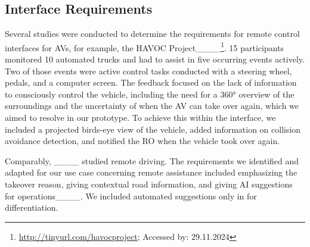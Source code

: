 


\subsection{Interface Requirements}
\label{ssec:interfacereq}
Several studies were conducted to determine the requirements for remote control interfaces for AVs, for example, the HAVOC Project____\footnote{\url{http://tinyurl.com/havocproject}; Accessed by: 29.11.2024}. 15 participants monitored 10 automated trucks and had to assist in five occurring events actively. Two of those events were active control tasks conducted with a steering wheel, pedals, and a computer screen. %
The feedback focused on the lack of information to consciously control the vehicle, including the need for a 360° overview of the surroundings and the uncertainty of when the AV can take over again, which we aimed to resolve in our prototype. To achieve this within the interface, we included a projected birds-eye view of the vehicle, added information on collision avoidance detection, and notified the RO when the vehicle took over again.

Comparably, ____ studied remote driving.  %
The requirements we identified and adapted for our use case concerning remote assistance included emphasizing the takeover reason, giving contextual road information, and giving AI suggestions for operations____. We included automated suggestions only in \pathPlanning for differentiation. %

